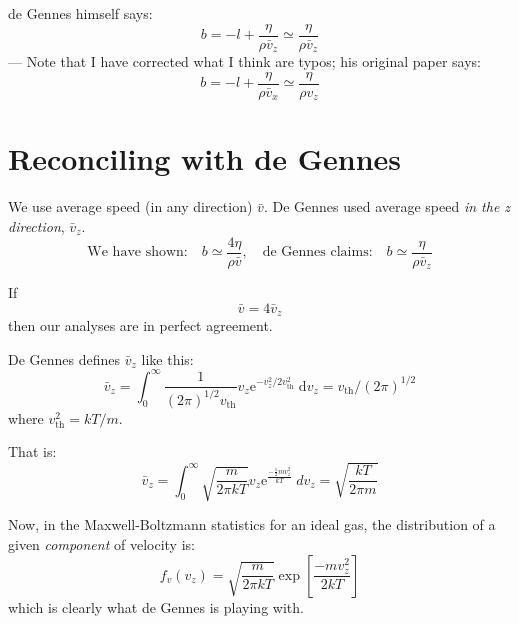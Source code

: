 \documentclass[12pt, a4paper, twoside, openright]{book}
\begin{document}
de Gennes himself says:
\begin{equation}
b = -l + \frac{\eta}{\rho \bar{v}_{z}} \simeq  \frac{\eta}{\rho \bar{v}_{z}}
\end{equation}
--- Note that I have corrected what I think are typos; his original paper says:
\begin{equation}
 b = -l + \frac{\eta}{\rho \bar{v}_{x}} \simeq  \frac{\eta}{\rho v_{z}}
\end{equation}


\section{Reconciling with de Gennes}

We use average speed (in any direction) $\bar{v}$. De Gennes used average speed \emph{in the z direction}, $\bar{v}_{z}$.
\begin{equation}
\text{We have shown:} \quad b \simeq \frac{4 \eta}{\rho \bar{v}}, \quad \text{de Gennes claims:} \quad
b \simeq \frac{\eta}{\rho \bar{v}_{z}}
\end{equation}

If 
\begin{equation}
\bar{v} = 4 \bar{v}_{z} 
\end{equation}
then our analyses are in perfect agreement.
\vspace*{1em}

De Gennes defines $\bar{v}_{z}$ like this:
\begin{equation}
\bar{v}_{z} = \int_{0}^{\infty} \frac{1}{(2 \pi)^{1/2} v_{\mathrm{th}} }
v_{z} \mathrm{e}^{-v_{z}^{2} / 2v_{\mathrm{th}}^{2}}  \; \mathrm{d} v_{z} = v_{\mathrm{th}} / (2 \pi)^{1/2}
\end{equation}
where $v_{\mathrm{th}}^{2} =  kT/m $.

That is:
\begin{equation}
\bar{v}_{z} = \int_{0}^{\infty} \sqrt{\frac{m}{2 \pi k T}} v_{z} 
   \mathrm{e}^{\frac{- \frac{1}{2} m v_{z}^{2}}{kT}} \; dv_{z} = 
   \sqrt{\frac{kT}{2 \pi m}}
\end{equation}
   
Now, in the Maxwell-Boltzmann statistics for an ideal gas, the distribution of a given \emph{component} of velocity is:
\begin{equation}
f_{v}(v_{z}) = \sqrt{\frac{m}{2 \pi k T}} \exp
  \left[ \frac{-m v_{z}^{2}}{2 k T} \right]
\end{equation}
which is clearly what de Gennes is playing with.
\end{document}

